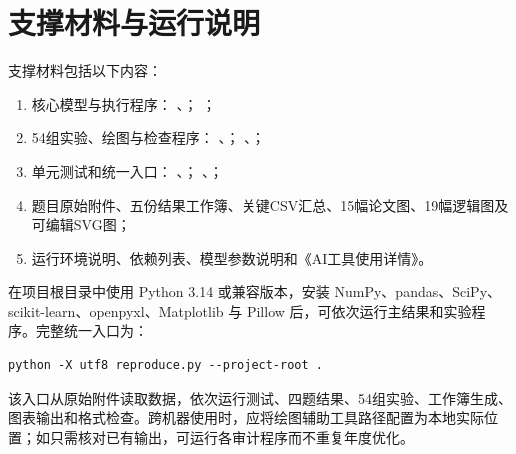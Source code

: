 \section{支撑材料与运行说明}

支撑材料包括以下内容：
\begin{enumerate}[label=（\arabic*）]
  \item 核心模型与执行程序：\newline
  、；\newline
  ；
  \item 54组实验、绘图与检查程序：\newline
  、；\newline
  、；
  \item 单元测试和统一入口：\newline
  、；\newline
  、；
  \item 题目原始附件、五份结果工作簿、关键CSV汇总、15幅论文图、19幅逻辑图及可编辑SVG图；
  \item 运行环境说明、依赖列表、模型参数说明和《AI工具使用详情》。
\end{enumerate}

在项目根目录中使用 Python 3.14 或兼容版本，安装 NumPy、pandas、SciPy、scikit-learn、openpyxl、Matplotlib 与 Pillow 后，可依次运行主结果和实验程序。完整统一入口为：
\begin{Verbatim}[fontsize=\small]
python -X utf8 reproduce.py --project-root .
\end{Verbatim}
该入口从原始附件读取数据，依次运行测试、四题结果、54组实验、工作簿生成、图表输出和格式检查。跨机器使用时，应将绘图辅助工具路径配置为本地实际位置；如只需核对已有输出，可运行各审计程序而不重复年度优化。
